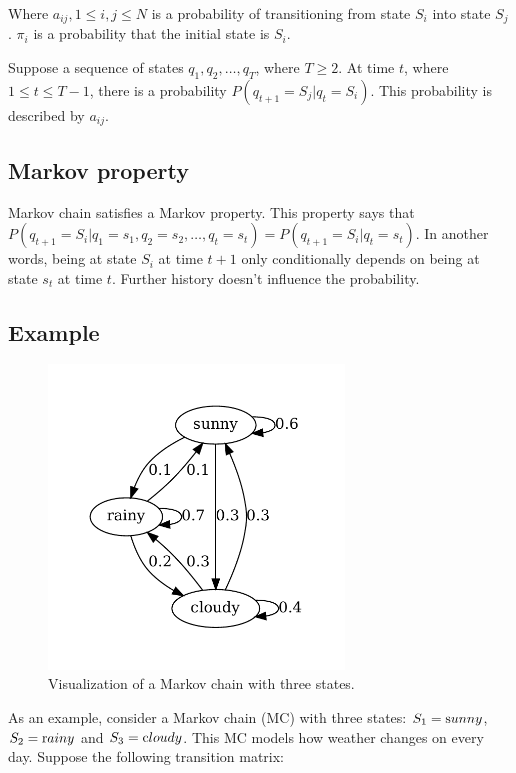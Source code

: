 \documentclass[thesis=B,english]{FITthesis}[2012/06/26]
\begin{document}
Where $a_{ij}, 1 \leq i,j \leq N$ is a probability of transitioning from state $S_i$ into state $S_j$. $\pi_i$ is a probability that the initial state is $S_i$.

Suppose a sequence of states $q_1, q_2, \dots, q_T$, where $T \geq 2$. At time $t$, where $1 \leq t \leq T-1$, there is a probability $P(q_{t+1}=S_j | q_t=S_i)$. This probability is described by $a_{ij}$.

\subsection{Markov property}
Markov chain satisfies a Markov property. This property says that $P(q_{t+1}=S_i|q_1=s_1,q_2=s_2,\dots,q_t=s_t) = P(q_{t+1}=S_{i}|q_t=s_t)$. In another words, being at state $S_i$ at time $t+1$ only conditionally depends on being at state $s_t$ at time $t$. Further history doesn't influence the probability.

\subsection{Example}

\begin{figure}
	\centering
 	\includegraphics[width=0.7\textwidth]{mc}
 	\caption{Visualization of a Markov chain with three states.}
 	\label{fig:mc}
\end{figure}

As an example, consider a Markov chain (MC) with three states: $S_1 = \text sunny$, $S_2 = \text rainy$ and $S_3 = \text cloudy$. This MC models how weather changes on every day. Suppose the following transition matrix:
\end{document}
